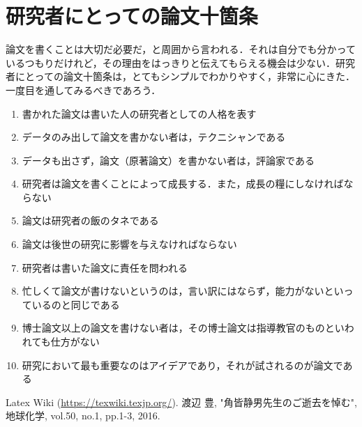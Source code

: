 \documentclass[a4paper,10pt,twocolumn,uplatex]{jsarticle}
\begin{document}
\section{研究者にとっての論文十箇条}
論文を書くことは大切だ必要だ，と周囲から言われる．それは自分でも分かっているつもりだけれど，その理由をはっきりと伝えてもらえる機会は少ない．研究者にとっての論文十箇条\cite{whats_paper}は，とてもシンプルでわかりやすく，非常に心にきた．一度目を通してみるべきであろう．

\begin{enumerate} %
  \item 書かれた論文は書いた人の研究者としての人格を表す
  \item データのみ出して論文を書かない者は，テクニシャンである
  \item データも出さず，論文（原著論文）を書かない者は，評論家である
  \item 研究者は論文を書くことによって成長する．また，成長の糧にしなければならない
  \item 論文は研究者の飯のタネである
  \item 論文は後世の研究に影響を与えなければならない
  \item 研究者は書いた論文に責任を問われる
  \item 忙しくて論文が書けないというのは，言い訳にはならず，能力がないといっているのと同じである
  \item 博士論文以上の論文を書けない者は，その博士論文は指導教官のものといわれても仕方がない
  \item 研究において最も重要なのはアイデアであり，それが試されるのが論文である
\end{enumerate}

\footnotesize{
  \begin{thebibliography}{99}
     Latex Wiki (\url{https://texwiki.texjp.org/}).
     渡辺 豊, "角皆静男先生のご逝去を悼む", 地球化学, vol.50, no.1, pp.1-3, 2016.
  \end{thebibliography}
}

\end{document}
